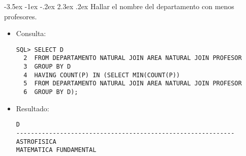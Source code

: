 \documentclass[11pt]{report}
\makeatletter
\renewcommand\chapter{\@startsection{chapter}{0}{\z@}%
    {-3.5ex \@plus -1ex \@minus -.2ex}%
    {2.3ex \@plus.2ex}%
    {\normalfont\Large\bfseries}}
\makeatother
\begin{document}
\chapter{Hallar el nombre del departamento con menos profesores.}
\begin{itemize}
  \item Consulta:
  \begin{verbatim}
SQL> SELECT D
  2  FROM DEPARTAMENTO NATURAL JOIN AREA NATURAL JOIN PROFESOR
  3  GROUP BY D
  4  HAVING COUNT(P) IN (SELECT MIN(COUNT(P))
  5  FROM DEPARTAMENTO NATURAL JOIN AREA NATURAL JOIN PROFESOR
  6  GROUP BY D); 
  \end{verbatim}
  \item{Resultado:}
  \begin{verbatim}
D                                                                               
------------------------------------------------------------                    
ASTROFISICA                                                                     
MATEMATICA FUNDAMENTAL                                                                         
  \end{verbatim}
\end{itemize}
\end{document}
